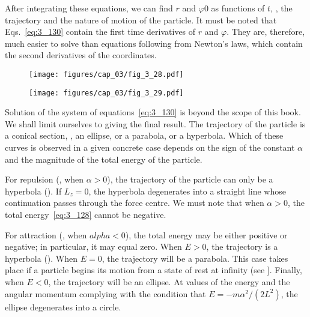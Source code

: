 \noindent
After integrating these equations, we can find $r$ and $\varphi0$ as functions of $t$, \ie, the trajectory and the nature of motion of the particle. It must be noted that Eqs.~\eqref{eq:3_130} contain the first time derivatives of $r$ and $\varphi$. They are, therefore, much easier to solve than equations following from Newton's laws, which contain the second derivatives of the coordinates.

\begin{figure}[t]
	\begin{minipage}[t]{0.5\linewidth}
		\begin{center}
			\texttt{[image: figures/cap\_03/fig\_3\_28.pdf]}
			\caption[]{}
			\label{fig:3_28}
		\end{center}
	\end{minipage}
	\hspace{-0.2cm}
	\begin{minipage}[t]{0.5\linewidth}
		\begin{center}
			\texttt{[image: figures/cap\_03/fig\_3\_29.pdf]}
			\caption[]{}
			\label{fig:3_29}
		\end{center}
	\end{minipage}
	\vspace{-0.3cm}
\end{figure}

Solution of the system of equations~\eqref{eq:3_130} is beyond the scope of this book. We shall limit ourselves to giving the final result. The trajectory of the particle is a conical section, \ie, an ellipse, or a parabola, or a hyperbola. Which of these curves is observed in a given concrete case depends on the sign of the constant $\alpha$ and the magnitude of the total energy of the particle.

For repulsion (\ie, when $\alpha>0$), the trajectory of the particle can only be a hyperbola (). If $L_z=0$, the hyperbola degenerates into a straight line whose continuation passes through the force centre. We must note that when $\alpha>0$, the total energy~\eqref{eq:3_128} cannot be negative.

For attraction (\ie, when $alpha<0$), the total energy may be either positive or negative; in particular, it may equal zero. When $E>0$, the trajectory is a hyperbola (). When $E=0$, the trajectory will be a parabola. This case takes place if a particle begins its motion from a state of rest at infinity (see ]. Finally, when $E<0$, the trajectory will be an ellipse. At values of the energy and the angular momentum complying with the condition that $E=- m\alpha^2/(2L^2)$, the ellipse degenerates into a circle.

